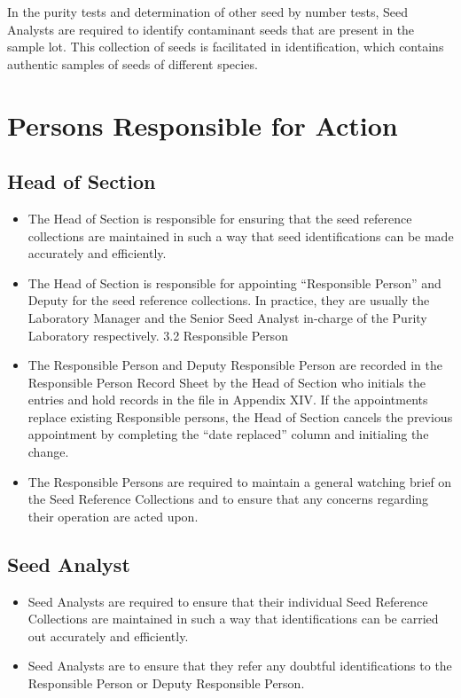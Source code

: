 \documentclass[]{book}
\providecommand{\tightlist}{%
  \setlength{\itemsep}{0pt}\setlength{\parskip}{0pt}}
\begin{document}
In the purity tests and determination of other seed by number tests,
Seed Analysts are required to identify contaminant seeds that are
present in the sample lot. This collection of seeds is facilitated in
identification, which contains authentic samples of seeds of different
species.

\section{Persons Responsible for
Action}\label{persons-responsible-for-action-1}

\subsection{Head of Section}\label{head-of-section}

\begin{itemize}
\tightlist
\item
  The Head of Section is responsible for ensuring that the seed
  reference collections are maintained in such a way that seed
  identifications can be made accurately and efficiently.
\item
  The Head of Section is responsible for appointing ``Responsible
  Person'' and Deputy for the seed reference collections. In practice,
  they are usually the Laboratory Manager and the Senior Seed Analyst
  in-charge of the Purity Laboratory respectively. 3.2 Responsible
  Person
\item
  The Responsible Person and Deputy Responsible Person are recorded in
  the Responsible Person Record Sheet by the Head of Section who
  initials the entries and hold records in the file in Appendix XIV. If
  the appointments replace existing Responsible persons, the Head of
  Section cancels the previous appointment by completing the ``date
  replaced'' column and initialing the change.
\item
  The Responsible Persons are required to maintain a general watching
  brief on the Seed Reference Collections and to ensure that any
  concerns regarding their operation are acted upon.
\end{itemize}

\subsection{Seed Analyst}\label{seed-analyst}

\begin{itemize}
\tightlist
\item
  Seed Analysts are required to ensure that their individual Seed
  Reference Collections are maintained in such a way that
  identifications can be carried out accurately and efficiently.
\item
  Seed Analysts are to ensure that they refer any doubtful
  identifications to the Responsible Person or Deputy Responsible
  Person.
\end{itemize}
\end{document}
